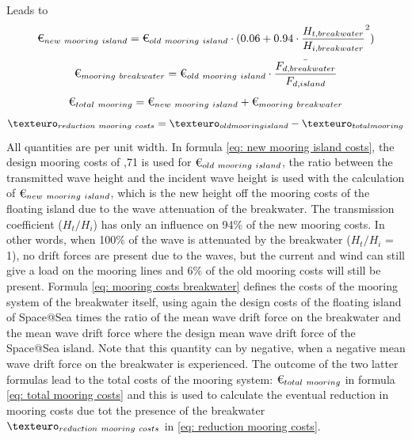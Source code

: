 Leads to
\begin{equation}
    \text{\texteuro}_{new~mooring~island} =  \text{\texteuro}_{old~mooring~island} \cdot (0.06+ 0.94\cdot \frac{H_{t,breakwater}}{H_{i,breakwater}}^2)
    \label{eq: new mooring island costs}
\end{equation}
\begin{equation}
    \text{\texteuro}_{mooring~breakwater} = \text{\texteuro}_{old~mooring~island} \cdot \frac{\bar{F_{d, breakwater}}}{F_{d, island}}\\
    \label{eq: mooring costs breakwater}
\end{equation}
\begin{equation}
    \text{\texteuro}_{total~mooring} = \text{\texteuro}_{new~mooring~island} + \text{\texteuro}_{mooring~breakwater}
    \label{eq: total mooring costs}
\end{equation}
\begin{equation}
    \texteuro_{reduction~mooring~costs} = \texteuro_{old mooring island}- \texteuro_{total mooring}
    \label{eq: reduction mooring costs}
\end{equation}
All quantities are per unit width. In formula \ref{eq: new mooring island costs}, the design mooring costs of ,71 is used for $\text{\texteuro}_{old~mooring~island}$, the ratio between the transmitted wave height and the incident wave height is used with the calculation of $\text{\texteuro}_{new~mooring~island}$, which is the new height off the mooring costs of the floating island due to the wave attenuation of the breakwater. The transmission coefficient ($H_t/H_i$) has only an influence on 94\% of the new mooring costs. In other words, when 100\% of the wave is attenuated by the breakwater ($H_t/H_i$ = 1), no drift forces are present due to the waves, but the current and wind can still give a load on the mooring lines and 6\% of the old mooring costs will still be present.
Formula \ref{eq: mooring costs breakwater} defines the costs of the mooring system of the breakwater itself, using again the design costs of the floating island of Space@Sea times the ratio of the mean wave drift force on the breakwater and the mean wave drift force where the design mean wave drift force of the Space@Sea island. Note that this quantity can by negative, when a negative mean wave drift force on the breakwater is experienced.
The outcome of the two latter formulas lead to the total costs of the mooring system: $\text{\texteuro}_{total~mooring}$ in formula \ref{eq: total mooring costs} and this is used to calculate the eventual reduction in mooring costs due tot the presence of the breakwater $\texteuro_{reduction~mooring~costs}$ in \ref{eq: reduction mooring costs}.




